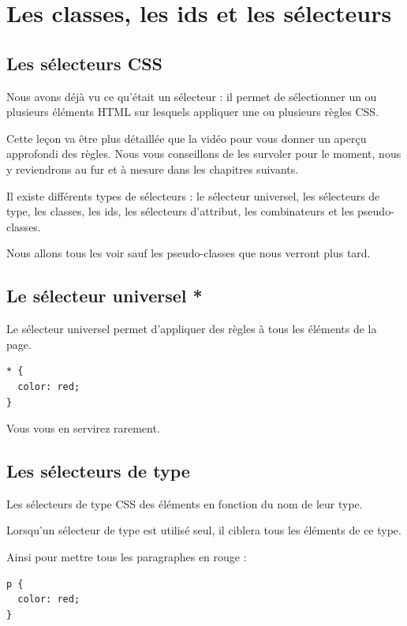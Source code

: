 \documentclass[a4paper]{article}
\begin{document}

\section{Les classes, les ids et les sélecteurs}
\subsection{Les sélecteurs CSS}
Nous avons déjà vu ce qu'était un sélecteur : il permet de sélectionner un ou plusieurs éléments HTML sur lesquels appliquer une ou plusieurs règles CSS.

Cette leçon va être plus détaillée que la vidéo pour vous donner un aperçu approfondi des règles. Nous vous conseillons de les survoler pour le moment, nous y reviendrons au fur et à mesure dans les chapitres suivants.

Il existe différents types de sélecteurs : le sélecteur universel, les sélecteurs de type, les classes, les ids, les sélecteurs d'attribut, les combinateurs et les pseudo-classes.

Nous allons tous les voir sauf les pseudo-classes que nous verront plus tard.

\subsection{Le sélecteur universel *}
Le sélecteur universel permet d'appliquer des règles à tous les éléments de la page.
\begin{verbatim}
* {
  color: red;
}
\end{verbatim}
Vous vous en servirez rarement.

\subsection{Les sélecteurs de type}
Les sélecteurs de type CSS des éléments en fonction du nom de leur type.

Lorsqu'un sélecteur de type est utilisé seul, il ciblera tous les éléments de ce type.

Ainsi pour mettre tous les paragraphes en rouge :
\begin{verbatim}
p {
  color: red;
}
\end{verbatim}
\end{document}
